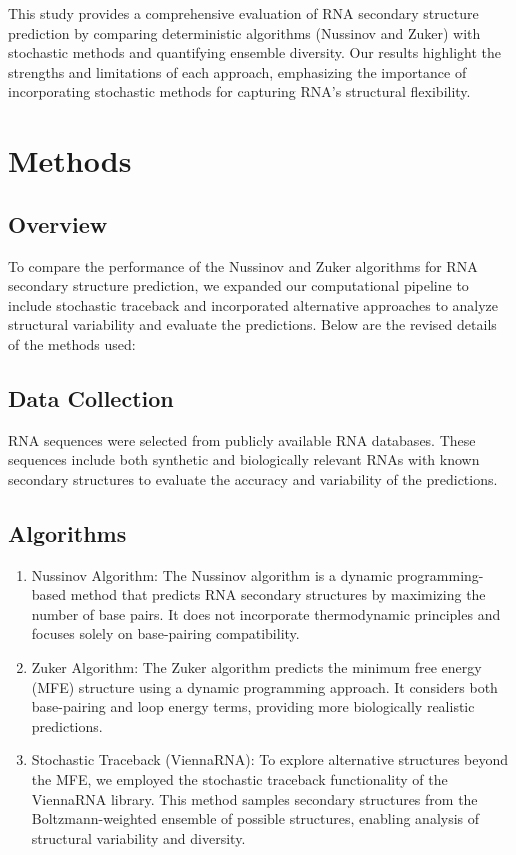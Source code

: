 \documentclass[10pt]{wlscirep}
\begin{document}
This study provides a comprehensive evaluation of RNA secondary structure prediction by comparing deterministic algorithms (Nussinov and Zuker) with stochastic methods and quantifying ensemble diversity. Our results highlight the strengths and limitations of each approach, emphasizing the importance of incorporating stochastic methods for capturing RNA's structural flexibility.

\section{Methods} 

\subsection{Overview}
To compare the performance of the Nussinov and Zuker algorithms for RNA secondary structure prediction, we expanded our computational pipeline to include stochastic traceback and incorporated alternative approaches to analyze structural variability and evaluate the predictions. Below are the revised details of the methods used:

\subsection{Data Collection}

RNA sequences were selected from publicly available RNA databases. These sequences include both synthetic and biologically relevant RNAs with known secondary structures to evaluate the accuracy and variability of the predictions.

\subsection{Algorithms}

\begin{enumerate}
\item Nussinov Algorithm: The Nussinov algorithm is a dynamic programming-based method that predicts RNA secondary structures by maximizing the number of base pairs. It does not incorporate thermodynamic principles and focuses solely on base-pairing compatibility.
\item Zuker Algorithm: The Zuker algorithm predicts the minimum free energy (MFE) structure using a dynamic programming approach. It considers both base-pairing and loop energy terms, providing more biologically realistic predictions.
\item Stochastic Traceback (ViennaRNA): To explore alternative structures beyond the MFE, we employed the stochastic traceback functionality of the ViennaRNA library. This method samples secondary structures from the Boltzmann-weighted ensemble of possible structures, enabling analysis of structural variability and diversity.
\end{enumerate}
\end{document}
